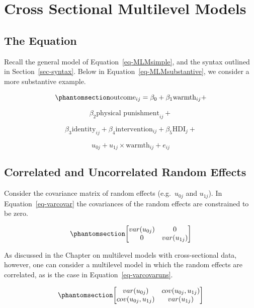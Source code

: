 \documentclass[
  letterpaper,
  DIV=11,
  numbers=noendperiod]{scrreprt}
\begin{document}

\chapter{Cross Sectional Multilevel Models}\label{sec-crosssectional}

\section{The Equation}\label{the-equation-2}

Recall the general model of Equation~\ref{eq-MLMsimple}, and the syntax
outlined in Section~\ref{sec-syntax}. Below in
Equation~\ref{eq-MLMsubstantive}, we consider a more substantive
example.

\begin{equation}\phantomsection\label{eq-MLMsubstantive}{\text{outcome}_{ij}= \beta_0 + \beta_1 \text{warmth}_{ij} +}\end{equation}

\[\beta_2 \text{physical punishment}_{ij} +\]

\[\beta_3 \text{identity}_{ij} + \beta_4 \text{intervention}_{ij} + \beta_5 \text{HDI}_{j} +\]

\[u_{0j} + u_{1j} \times \text{warmth}_{ij} + e_{ij}\]

\section{Correlated and Uncorrelated Random
Effects}\label{sec-correlated-uncorrelated}

Consider the covariance matrix of random effects (e.g.~\(u_{0j}\) and
\(u_{1j}\)). In Equation~\ref{eq-varcovar} the covariances of the random
effects are constrained to be zero.

\begin{equation}\phantomsection\label{eq-varcovar}{\begin{bmatrix}
var(u_{0j}) & 0 \\
0 & var(u_{1j}) 
\end{bmatrix}}\end{equation}

As discussed in the Chapter on multilevel models with cross-sectional
data, however, one can consider a multilevel model in which the random
effects are correlated, as is the case in Equation~\ref{eq-varcovaruns}.

\begin{equation}\phantomsection\label{eq-varcovaruns}{\begin{bmatrix}
var(u_{0j}) & cov(u_{0j}, u_{1j}) \\
cov(u_{0j}, u_{1j}) & var(u_{1j}) 
\end{bmatrix}}\end{equation}
\end{document}
